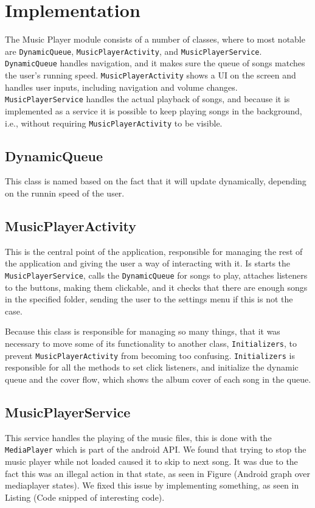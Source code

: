 \section{Implementation}
The Music Player module consists of a number of classes, where to most notable are \texttt{DynamicQueue}, \texttt{MusicPlayerActivity}, and \texttt{MusicPlayerService}. \texttt{DynamicQueue} handles navigation, and it makes sure the queue of songs matches the user's running speed. \texttt{MusicPlayerActivity} shows a UI on the screen and handles user inputs, including navigation and volume changes. \texttt{MusicPlayerService} handles the actual playback of songs, and because it is implemented as a service it is possible to keep playing songs in the background, i.e., without requiring \texttt{MusicPlayerActivity} to be visible.

\subsection{DynamicQueue}
\label{sec:dynamicQueue}
This class is named based on the fact that it will update dynamically, depending on the runnin speed of the user.

\subsection{MusicPlayerActivity}
This is the central point of the application, responsible for managing the rest of the application and giving the user a way of interacting with it. Is starts the \texttt{MusicPlayerService}, calls the \texttt{DynamicQueue} for songs to play, attaches listeners to the buttons, making them clickable, and it checks that there are enough songs in the specified folder, sending the user to the settings menu if this is not the case.

Because this class is responsible for managing so many things, that it was necessary to move some of its functionality to another class, \texttt{Initializers}, to prevent \texttt{MusicPlayerActivity} from becoming too confusing. \texttt{Initializers} is responsible for all the methods to set click listeners, and initialize the dynamic queue and the cover flow, which shows the album cover of each song in the queue.

\subsection{MusicPlayerService} 
This service handles the playing of the music files, this is done with the \texttt{MediaPlayer} \citet{android:MediaPlayer} which is part of the android API. 
 We found that trying to stop the music player while not loaded caused it to skip to next song. It was due to the fact this was an illegal action in that state, as seen in Figure (Android graph over mediaplayer states). We fixed this issue by implementing something, as seen in Listing (Code snipped of interesting code).